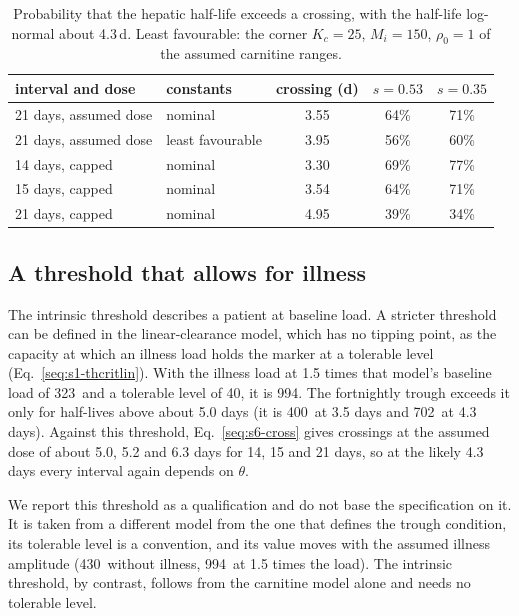 \begin{table}[tbp]
\centering
\small
\caption{\label{stab:s6-prob}Probability that the hepatic half-life exceeds a crossing, with
the half-life log-normal about 4.3\,d. Least favourable: the corner $K_c=25$\uM, $M_i=150$\uM,
$\rho_0=1$ of the assumed carnitine ranges.}
\begin{tabular}{@{}llccc@{}}
\toprule
interval and dose & constants & crossing (d) & $s=0.53$ & $s=0.35$ \\
\midrule
21 days, assumed dose & nominal & 3.55 & 64\% & 71\% \\
21 days, assumed dose & least favourable & 3.95 & 56\% & 60\% \\
14 days, capped & nominal & 3.30 & 69\% & 77\% \\
15 days, capped & nominal & 3.54 & 64\% & 71\% \\
21 days, capped & nominal & 4.95 & 39\% & 34\% \\
\bottomrule
\end{tabular}
\end{table}

\subsection{A threshold that allows for illness}
\label{si:s6:illness}

The intrinsic threshold describes a patient at baseline load. A stricter threshold can be
defined in the linear-clearance model, which has no tipping point, as the capacity at which an
illness load holds the marker at a tolerable level (Eq.~\eqref{seq:s1-thcritlin}). With the
illness load at 1.5 times that model's baseline load of 323\um\ and a tolerable level of
40\uM, it is 994\um. The fortnightly trough exceeds it only for half-lives above about 5.0 days
(it is 400\um\ at 3.5 days and 702\um\ at 4.3 days). Against this threshold, Eq.~\eqref{seq:s6-cross}
gives crossings at the assumed dose of about 5.0, 5.2 and 6.3 days for 14, 15 and 21 days, so at
the likely 4.3 days every interval again depends on $\theta$.

We report this threshold as a qualification and do not base the specification on it. It is
taken from a
different model from the one that defines the trough condition, its tolerable level is a
convention, and its value moves with the assumed illness amplitude (430\um\ without illness,
994\um\ at 1.5 times the load). The intrinsic threshold, by contrast, follows from the carnitine
model alone and needs no tolerable level.

